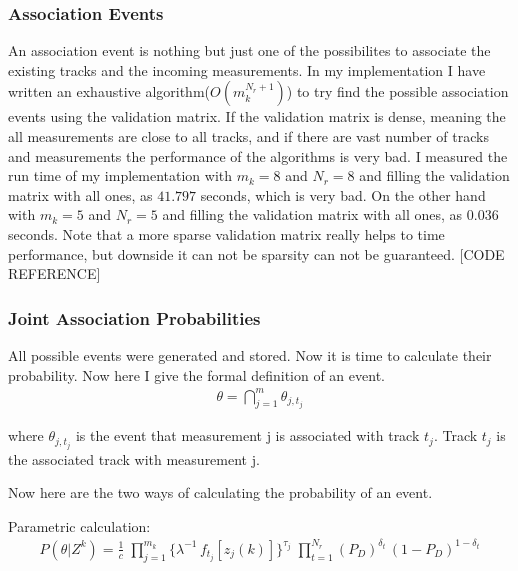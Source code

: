 \documentclass[peerreview]{IEEEtran}
\begin{document}
\vspace{10px}

\subsubsection{Association Events}
An association event is nothing but just one of the possibilites to associate the existing tracks and the incoming measurements. In my implementation I have written an exhaustive algorithm($O(m_k^{N_r+1})$) to try find the possible association events using the validation matrix. If the validation matrix is dense, meaning the all measurements are close to all tracks, and if there are vast number of tracks and measurements the performance of the algorithms is very bad. I measured the run time of my implementation with $m_k = 8$ and $N_r = 8$ and filling the validation matrix with all ones, as $41.797$ seconds, which is very bad. On the other hand with $m_k = 5$ and $N_r = 5$ and filling the validation matrix with all ones, as $0.036$ seconds. Note that a more sparse validation matrix really helps to time performance, but downside it can not be sparsity can not be guaranteed. [CODE REFERENCE]

\vspace{10px}

\subsubsection{Joint Association Probabilities}
All possible events were generated and stored. Now it is time to calculate their probability. Now here I give the formal definition of an event.
\begin{equation}
\begin{aligned}
\theta = \bigcap\limits_{j=1}^m \theta_{j,t_j}
\end{aligned}
\end{equation}

where $\theta_{j,t_j}$ is the event that measurement j is associated with track $t_j$. Track $t_j$ is the associated track with measurement j.

Now here are the two ways of calculating the probability of an event.
\vspace{5px}

Parametric calculation:
\begin{equation}
\begin{aligned}
P(\theta|Z^k) = \frac{1}{c} \; \prod\limits_{j=1}^{m_k} \{ \lambda^{-1} \, f_{t_j}[z_j(k)] \} ^{\tau_j} \; \prod\limits_{t=1}^{N_r} (P_D)^{\delta_t} \, (1-P_D)^{1-\delta_t}
\end{aligned}
\end{equation}
\end{document}
